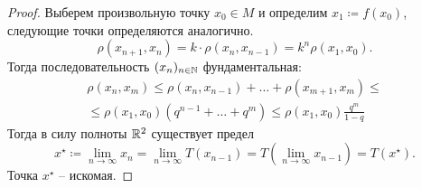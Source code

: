 \documentclass[10pt]{article}
\begin{document}
\begin{tasks}
\begin{proof}
        Выберем произвольную точку $x_0 \in M$ и определим $x_1 \coloneq f(x_0)$, следующие точки определяются аналогично. 
        \begin{equation}
            \rho(x_{n+1}, x_n) = k\cdot\rho(x_n, x_{n-1}) = k^n\rho(x_1, x_0).
        \end{equation}
        Тогда последовательность $(x_n)_{n\in \mathbb N}$ фундаментальная: \begin{equation}\begin{aligned}
            \rho(x_n, x_m) \leqslant \rho(x_n, x_{n-1}) + \ldots + \rho(x_{m+1}, x_m)  \leqslant \\ \leqslant \rho(x_1, x_0)(q^{n-1} + \ldots + q^m) \leqslant \rho(x_1, x_0)\frac{q^m}{1-q}
        \end{aligned}
        \end{equation}
        Тогда в силу полноты $\mathbb R^2$ существует предел \begin{equation}
            x^\star \coloneq \lim_{n\to\infty}x_n = \lim_{n\to \infty} T(x_{n-1}) =T\left(\lim_{n\to \infty}x_{n-1}\right) = T(x^\star).
        \end{equation} 
        Точка $x^\star$ -- искомая.
    \end{proof}


\end{tasks}
\end{document}
